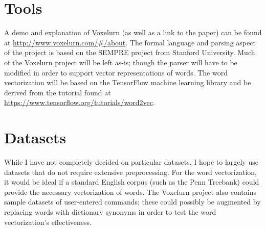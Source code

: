 \documentclass[a4paper]{article}
\begin{document}
\section{Tools}

A demo and explanation of Voxelurn (as well as a link to the paper)
can be found at \url{http://www.voxelurn.com/#/about}. The formal
language and parsing aspect of the project is based on the SEMPRE
project from Stanford University. Much of the
Voxelurn project will be left as-is; though the parser will have
to be modified in order to support vector representations of words.
The word vectorization will be based on the TensorFlow machine
learning library and be derived from the tutorial found at 
\url{https://www.tensorflow.org/tutorials/word2vec}.
\section{Datasets}

While I have not completely decided on particular datasets, I hope
to largely use datasets that do not require extensive preprocessing.
For the word vectorization, it would be ideal if a standard English corpus (such as the Penn Treebank) could provide the necessary
vectorization of words. The Voxelurn project also contains sample
datasets of user-entered commands; these could possibly be augmented
by replacing words with dictionary synonyms in order to test the
word vectorization's effectiveness.
\fi

{}

\end{document}
